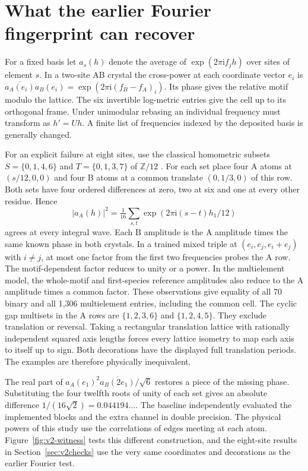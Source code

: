 \section{What the earlier Fourier fingerprint can recover}
For a fixed basis let $a_s(h)$ denote the average of $\exp(2\pi\mathrm{i}f_jh)$ over sites of element $s$. In a two-site AB crystal the cross-power at each coordinate vector $e_i$ is $\overline{a_A(e_i)}a_B(e_i)=\exp(2\pi\mathrm{i}(f_B-f_A)_i)$. Its phase gives the relative motif modulo the lattice. The six invertible log-metric entries give the cell up to its orthogonal frame. Under unimodular rebasing an individual frequency must transform as $h'=Uh$. A finite list of frequencies indexed by the deposited basis is generally changed.

For an explicit failure at eight sites, use the classical homometric subsets $S=\{0,1,4,6\}$ and $T=\{0,1,3,7\}$ of $\mathbb Z/12$ \cite{zrelation,homometry}. For each set place four A atoms at $(s/12,0,0)$ and four B atoms at a common translate $(0,1/3,0)$ of this row. Both sets have four ordered differences at zero, two at six and one at every other residue. Hence
\[
 \left|a_A(h)\right|^2=\tfrac1{16}\sum_{s,t}\exp(2\pi\mathrm{i}(s-t)h_1/12)
\]
agrees at every integral wave. Each B amplitude is the A amplitude times the same known phase in both crystals. In a trained mixed triple at $(e_i,e_j,e_i+e_j)$ with $i\ne j$, at most one factor from the first two frequencies probes the A row. The motif-dependent factor reduces to unity or a power. In the multielement model, the whole-motif and first-species reference amplitudes also reduce to the A amplitude times a common factor. These observations give equality of all 70 binary and all 1,306 multielement entries, including the common cell. The cyclic gap multisets in the A rows are $\{1,2,3,6\}$ and $\{1,2,4,5\}$. They exclude translation or reversal. Taking a rectangular translation lattice with rationally independent squared axis lengths forces every lattice isometry to map each axis to itself up to sign. Both decorations have the displayed full translation periods. The examples are therefore physically inequivalent.

The real part of $a_A(e_1)^2\overline{a_B(2e_1)}/\sqrt6$ restores a piece of the missing phase. Substituting the four twelfth roots of unity of each set gives an absolute difference $1/(16\sqrt2)=0.044194\ldots$. The baseline independently evaluated the implemented blocks and the extra channel in double precision. The physical powers of this study use the correlations of edges meeting at each atom. Figure~\ref{fig:v2-witness} tests this different construction, and the eight-site results in Section~\ref{sec:v2checks} use the very same coordinates and decorations as the earlier Fourier test.

